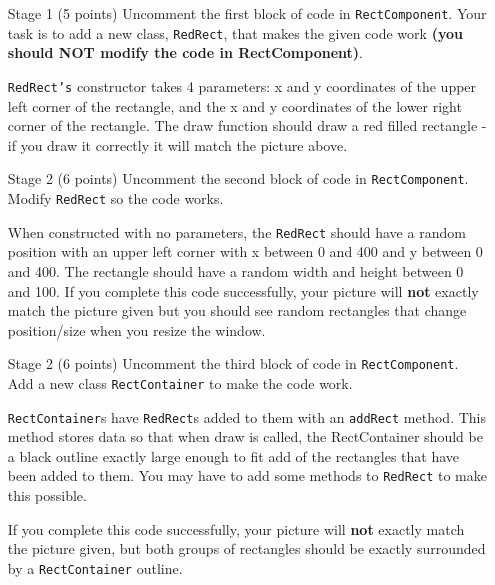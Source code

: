 \documentclass[12pt,twoside]{article}
\newcommand{\code}[1]{\texttt{#1}}
\begin{document}
\begin{itemize}
\item[Stage 1] (5 points) Uncomment the first block of code in \code{RectComponent}.  Your task is to add a new class, \code{RedRect}, that makes the given code work \textbf{(you should NOT modify the code in RectComponent)}.  

\code{RedRect's} constructor takes 4 parameters: x and y coordinates of the upper left corner of the rectangle, and the x and y coordinates of the lower right corner of the rectangle.  The draw function should draw a red filled rectangle - if you draw it correctly it will match the picture above.

\item[Stage 2] (6 points) Uncomment the second block of code in \code{RectComponent}.  Modify \code{RedRect} so the code works.  

When constructed with no parameters, the \code{RedRect} should have a random position with an upper left corner with x between 0 and 400 and y between 0 and 400.  The rectangle should have a random width and height between 0 and 100.  If you complete this code successfully, your picture will \textbf{not} exactly match the picture given but you should see random rectangles that change position/size when you resize the window.

\item[Stage 2] (6 points) Uncomment the third block of code in \code{RectComponent}.  Add a new class \code{RectContainer} to make the code work. 

\code{RectContainer}s have \code{RedRect}s added to them with an \code{addRect} method.  This method stores data so that when draw is called, the RectContainer should be a black outline exactly large enough to fit add of the rectangles that have been added to them.  You may have to add some methods to \code{RedRect} to make this possible.  

If you complete this code successfully, your picture will \textbf{not} exactly match the picture given, but both groups of rectangles should be exactly surrounded by a \code{RectContainer} outline.


\end{itemize}
\end{document}

